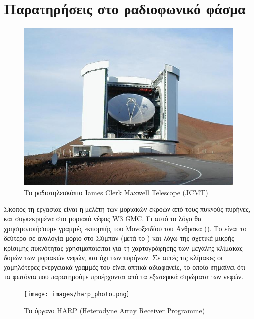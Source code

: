 \documentclass[a4paper,12pt]{memoir}
\begin{document}
\chapter{Παρατηρήσεις στο ραδιοφωνικό φάσμα}

\begin{figure}[hb]
	\centering
	\includegraphics[width=12cm]{images/JCMT.jpg}
	\caption{Το ραδιοτηλεσκόπιο James Clerk Maxwell Telescope (JCMT)}
\end{figure}

Σκοπός τη εργασίας είναι η μελέτη των μοριακών εκροών από τους πυκνούς πυρήνες, και συγκεκριμένα στο μοριακό νέφος W3 GMC. Γι αυτό το λόγο θα χρησιμοποιήσουμε γραμμές εκπομπής του Μονοξειδίου του Άνθρακα (). Το  είναι το δεύτερο σε αναλογία μόριο στο Σύμπαν (μετά το ) και λόγω της σχετικά μικρής κρίσιμης πυκνότητας χρησιμοποιείται για τη χαρτογράφησης των μεγάλης κλίμακας δομών των μοριακών νεφών, και όχι των πυρήνων. Σε αυτές τις κλίμακες οι χαμηλότερες ενεργειακά γραμμές του  είναι οπτικά αδιαφανείς, το οποίο σημαίνει ότι τα φωτόνια που παρατηρούμε προέρχονται από τα εξωτερικά στρώματα των νεφών.

\begin{figure}
	\begin{flushright}
		\texttt{[image: images/harp\_photo.png]}
		\caption{Το όργανο HARP (Heterodyne Array Receiver Programme)}
	\end{flushright}
\end{figure}
\end{document}
